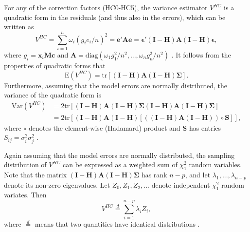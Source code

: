 \documentclass[12pt]{article}\usepackage[]{graphicx}\usepackage[]{color}
\newcommand{\E}{\text{E}}
\newcommand{\Var}{\text{Var}}
\newcommand{\tr}{\text{tr}}
\newcommand{\diag}{\text{diag}}
\newcommand{\bm}{\mathbf}
\newcommand{\bs}{\boldsymbol}
\begin{document}
For any of the correction factors (HC0-HC5), the variance estimator $V^{HC}$ is a quadratic form in the residuals (and thus also in the errors), which can be written as 
\[
V^{HC} = \sum_{i=1}^n \omega_i \left(g_i e_i / n \right)^2 = \bm{e}' \bm{A} \bm{e} = \bs\epsilon'\left(\bm{I} - \bm{H}\right)\bm{A}\left(\bm{I} - \bm{H}\right)\bs\epsilon , \]
where $g_i = \bm{x}_i \bm{M} \bm{c}$ and $\bm{A} = \diag\left(\omega_1 g_1^2 / n^2,...,\omega_n g_n^2 / n^2\right)$ \citep{Bell2002bias, Cribari-Neto2011new}. 
It follows from the properties of quadratic forms that 
\begin{equation}
\label{eq:V_expectation}
\E\left(V^{HC}\right) = \tr\left[\left(\bm{I} - \bm{H}\right)\bm{A}\left(\bm{I} - \bm{H}\right)\bs\Sigma\right]. 
\end{equation}
Furthermore, assuming that the model errors are normally distributed, the variance of the quadratic form is
\begin{equation}
\label{eq:V_variance}
\begin{aligned}
\Var\left(V^{HC}\right) &= 2\tr\left[\left(\bm{I} - \bm{H}\right)\bm{A}\left(\bm{I} - \bm{H}\right)\bs\Sigma\left(\bm{I} - \bm{H}\right)\bm{A}\left(\bm{I} - \bm{H}\right)\bs\Sigma\right] \\
&= 2\tr\left[\left(\bm{I} - \bm{H}\right)\bm{A}\left(\bm{I} - \bm{H}\right)\left[\left(\left(\bm{I} - \bm{H}\right)\bm{A}\left(\bm{I} - \bm{H}\right)\right)\circ \bm{S}\right]\right], 
\end{aligned}
\end{equation}
where $\circ$ denotes the element-wise (Hadamard) product and $\bm{S}$ has entries $S_{ij} = \sigma_i^2 \sigma_j^2$ \citep{Lipsitz1999degrees}. 

Again assuming that the model errors are normally distributed, the sampling distribution of $V^{HC}$ can be expressed as a weighted sum of $\chi^2_1$ random variables. 
Note that the matrix $\left(\bm{I} - \bm{H}\right)\bm{A}\left(\bm{I} - \bm{H}\right)\bs\Sigma$ has rank $n - p$, and let $\lambda_1,...,\lambda_{n - p}$ denote its non-zero eigenvalues. 
Let $Z_0,Z_1,Z_2,...$ denote independent $\chi^2_1$ random variates. 
Then 
\begin{equation}
\label{eq:weighted_sum_chi_sq}
V^{HC} \stackrel{d}{=} \sum_{i=1}^{n-p} \lambda_i Z_i,
\end{equation}
where $\stackrel{d}{=}$ means that two quantities have identical distributions \citep{mathai1992quadratic}. 
\end{document}

